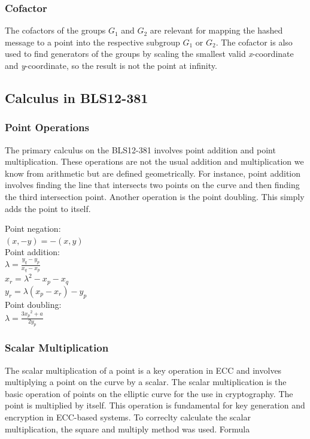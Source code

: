 \documentclass{article}
\begin{document}
\subsubsection{Cofactor}
The cofactors of the groups \(G_1\) and \(G_2\) are relevant for mapping the hashed message to a point into the respective subgroup \(G_1\) or \(G_2\). The cofactor is also used to find generators of the groups by scaling the smallest valid \textit{x}-coordinate and \textit{y}-coordinate, so the result is not the point at infinity. \cite{bls12-381-hackmd}

\subsection{Calculus in BLS12-381}
\subsubsection{Point Operations}
The primary calculus on the BLS12-381 involves point addition and point multiplication. These operations are not the usual addition and multiplication we know from arithmetic but are defined geometrically. For instance, point addition involves finding the line that intersects two points on the curve and then finding the third intersection point. Another operation is the point doubling. This simply adds the point to itself.
\begin{center}
  Point negation: \\
  \((x , -y)  = -(x , y) \) \\
  \vspace{5mm} 
  Point addition: \\
  \(\lambda = \frac{y_q - y_p}{x_q - x_p}\) \\
  \(x_r = \lambda ^2 - x_p - x_q\) \\
  \(y_r = \lambda(x_p - x_r) - y_p\) \\
  \vspace{5mm}
  Point doubling: \\
  \(\lambda = \frac{3{x_p}^2 + a}{2y_p}\)
\end{center}



\subsubsection{Scalar Multiplication}
The scalar multiplication of a point is a key operation in ECC and involves multiplying a point on the curve by a scalar. The scalar multiplication is the basic operation of points on the elliptic curve for the use in cryptography. The point is multiplied by itself. This operation is fundamental for key generation and encryption in ECC-based systems. To correclty calculate the scalar multiplication, the square and multiply method was used.
Formula
\end{document}
